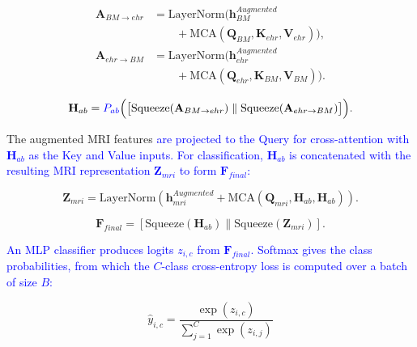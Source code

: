 \documentclass[lettersize,journal]{IEEEtran}
\begin{document}
    \begin{equation}
        \begin{aligned}
        \mathbf{A}_{BM \rightarrow ehr}
        &= \mathrm{LayerNorm}\bigl(\mathbf{h}_{BM}^{Augmented}\\
        &\qquad + \mathrm{MCA}(\mathbf{Q}_{BM}, \mathbf{K}_{ehr}, \mathbf{V}_{ehr})\bigr), \\
        \mathbf{A}_{ehr \rightarrow BM}
        &= \mathrm{LayerNorm}\bigl(\mathbf{h}_{ehr}^{Augmented}\\
        &\qquad + \mathrm{MCA}(\mathbf{Q}_{ehr}, \mathbf{K}_{BM}, \mathbf{V}_{BM})\bigr).
        \end{aligned}
        \label{eq:bidirectional_mca}
    \end{equation}

    \begin{equation}
        \mathbf{H}_{ab} = \textcolor{blue}{P_{ab}}\Big(\big[\mathrm{Squeeze}(\mathbf{A}_{BM \rightarrow ehr}) \parallel \mathrm{Squeeze}(\mathbf{A}_{ehr \rightarrow BM})\big]\Big).
        \label{eq:hab_def}
    \end{equation}


    The augmented MRI features \textcolor{blue}{are projected to the Query for cross-attention with $\mathbf{H}_{ab}$ as the Key and Value inputs. For classification, $\mathbf{H}_{ab}$ is concatenated with the resulting MRI representation $\mathbf{Z}_{mri}$ to form $\mathbf{F}_{final}$:}

    \begin{equation}
        \mathbf{Z}_{mri} = \mathrm{LayerNorm}(\mathbf{h}_{mri}^{Augmented} + \mathrm{MCA}(\mathbf{Q}_{mri}, \mathbf{H}_{ab}, \mathbf{H}_{ab})).
        \label{eq:mri_alignment}
    \end{equation}

    \begin{equation}
    \mathbf{F}_{final} = [ \mathrm{Squeeze}(\mathbf{H}_{ab}) \parallel \mathrm{Squeeze}(\mathbf{Z}_{mri}) ].
    \label{eq:final_fusion}
    \end{equation}

    \textcolor{blue}{An MLP classifier produces logits $z_{i,c}$ from $\mathbf{F}_{final}$. Softmax gives the class probabilities, from which the $C$-class cross-entropy loss is computed over a batch of size $B$:}

    \begin{equation}
        \hat{y}_{i,c} = \frac{\exp(z_{i,c})}{\sum_{j=1}^{C} \exp(z_{i,j})}
        \label{eq:softmax}
    \end{equation}
\end{document}
